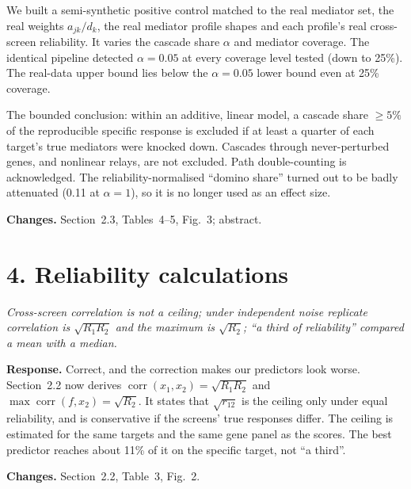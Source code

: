 \documentclass[10pt]{article}
\newenvironment{rev}{\par\medskip\noindent\color{black!70}\itshape}{\par}
\newcommand{\resp}{\par\smallskip\noindent\textbf{Response.} }
\newcommand{\chg}{\par\smallskip\noindent\textbf{Changes.} }
\begin{document}
We built a semi-synthetic positive control matched to the real mediator set, the real weights $a_{jk}/d_k$, the real mediator profile shapes and each profile's real cross-screen reliability. It varies the cascade share $\alpha$ and mediator coverage. The identical pipeline detected $\alpha=0.05$ at every coverage level tested (down to 25\%). The real-data upper bound lies below the $\alpha=0.05$ lower bound even at 25\% coverage.

The bounded conclusion: within an additive, linear model, a cascade share $\ge5\%$ of the reproducible specific response is excluded if at least a quarter of each target's true mediators were knocked down. Cascades through never-perturbed genes, and nonlinear relays, are not excluded. Path double-counting is acknowledged.
The reliability-normalised ``domino share'' turned out to be badly attenuated (0.11 at $\alpha=1$), so it is no longer used as an effect size.
\chg Section~2.3, Tables~4--5, Fig.~3; abstract.

\section*{4. Reliability calculations}
\begin{rev}Cross-screen correlation is not a ceiling; under independent noise replicate correlation is $\sqrt{R_1R_2}$ and the maximum is $\sqrt{R_2}$; ``a third of reliability'' compared a mean with a median.\end{rev}
\resp Correct, and the correction makes our predictors look worse. Section~2.2 now derives $\operatorname{corr}(x_1,x_2)=\sqrt{R_1R_2}$ and $\max\operatorname{corr}(f,x_2)=\sqrt{R_2}$. It states that $\sqrt{r_{12}}$ is the ceiling only under equal reliability, and is conservative if the screens' true responses differ.
The ceiling is estimated for the same targets and the same gene panel as the scores. The best predictor reaches about 11\% of it on the specific target, not ``a third''.
\chg Section~2.2, Table~3, Fig.~2.
\end{document}
